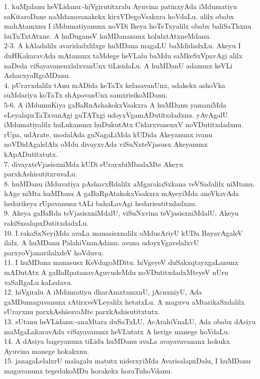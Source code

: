 \documentclass{article}
\begin{document}
1. kuMjalanu heVLidanu:-hiVgirutitxralu Ayuvina patinxyAda iMdumatiyu saKitaroDane naMdanavanakekx kirxVDegoVsakxra hoVdaLu. alilx obabx mahAtamxnu I iMdumatiyanunx noVDi Ikeya hoTeTxyalilx obabx baliSaThxnu huTuTxtAtxne. A huDuganeV huMDananunx kolulxtAtxneMdanu.\\
2-3. A kAladalilx avaridadxlilxge huMDana magaLU baMdidadxLu. Akeyu I duHKakaravAda mAtanunx taMdege heVLalu baMdu saMkeSxVpavAgi alilx naDeda viSayavanenxlalxvanUnx tiLisidaLu. A huMDanU adanunx keVLi AshacxyaRgoMDanu.\\
4. pUravxdalilx tAnu mADida keTaTx kelasavanUnx, adakekx ashoVka suMdariyu koTaTx shApavanUnx samxrisikoMDanu.\\
5-6. A iMdumuKiya gaBaRnAshakokxVsakxra A huMDanu yamaniMda eLeyalapxTaTxvanAgi guTATxgi udoyxVgamADutitxdadxnu. yAvAgalU iMdumatiyalilx huLukanunx huDukutAtx CidarxvanenxV noVDutitxdadxnu. rUpa, udArate, modalAda guNagaLiMda kUDida Akeyanunx ivanu noVDidAgalelAlx oMdu divayxvAda viSuNxteVjasusx Akeyanunx kApADutitxtutx.\\
7. divayxteVjasisxniMda kUDi sUrayxbiMbadaMte Akeyu parxkAshisutitxruvaLu.\\
8. huMDanu iMduvatiya pAshavxRdalilx aMgarakaSxkana veVSadalilx niMtanu. hAge niMta huMDanu A gaBaRpAtakokxVsakxra mAyeyiMda aneVkavAda hedarikeya rUpavanunx tALi bahaLavAgi hedarisutitxdadxnu.\\
9. Akeya gaBaRda teVjasisxniMdalU, viSuNxvina teVjasisxniMdalU, Akeyu rakiSxsalapxDutitxdadxLu.\\
10. I rakaSxNeyiMda avaLa manasisxnalilx oMdusAriyU kUDa BayavAgaleV ilalx. A huMDanu PalahiVnanAdanu. avana udoyxVgavelalxvU parxyoVjanavilalxdeV hoVduvu.\\
11. I huMDana manasusx KeVdagoMDitu. hiVgeyeV duSakxqtayxgaLanunx mADutAtx A gaBaRpatanavAguvudeMdu noVDutitxdadxMteyeV nUru vaSaRgaLu kaLedavu.\\
12. hiVgiralu A iMdumatiyu dharAmxtamxnU, jAcnxniyU, Ada gaMDumaguvanunx rAtirxveVLeyalilx hetatxLu. A maguvu aMtarikaSxdalilx sUrayxnu parxkAshisuvaMte parxkAshisutitxtutx.\\
13. sUtanu heVLidanu:-anaMtara duSaTxLU, AcArahiVnaLU, Ada obabx dAsiyu maMgaLakaravAda viSayavanunx heVLutatx A herige manege hoVdaLu.\\
14. A dAsiya bageyanunx tiLidu huMDanu avaLa avayavavananx hokukx Ayuvina manege hokakxnu.\\
15. janagaLelalxrU malagalu matutx niderxyiMda AvarisalapxDalu, I huMDanu maguvanunx tegedukoMDu horakekx horaTuhoVdanu.\\
\end{document}
